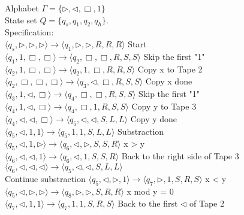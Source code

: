 \documentclass[12pt,a4paper]{article}
\theoremstyle{definition}
\numberwithin{equation}{section}
\numberwithin{figure}{section}
\begin{document}
\begin{enumerate}
Alphabet  $\Gamma = \{ \triangleright, \triangleleft, \Box, 1 \}$\\
State set $Q = \{ q_s, q_1, q_2, q_h \}$. \\
Specification:\\
$\langle q_s,\triangleright,\triangleright,\triangleright \rangle  \rightarrow  \langle q_1, \triangleright, \triangleright ,R , R, R \rangle$ Start\\
$\langle q_1, 1,\Box, \Box \rangle  \rightarrow  \langle q_2, \Box, \Box, R, S, S \rangle$ Skip the first "1"\\
$\langle q_2, 1,\Box, \Box \rangle  \rightarrow  \langle q_2, 1, \Box, R, R, S \rangle$ Copy x to Tape 2 \\
$\langle q_2, \Box, \Box, \Box \rangle  \rightarrow  \langle q_3, \triangleleft, \Box, R, S, S \rangle$ Copy x done \\
$\langle q_3, 1, \triangleleft, \Box \rangle  \rightarrow  \langle q_4, \Box, \Box, R, S, S \rangle$ Skip the first "1" \\
$\langle q_4, 1,\triangleleft, \Box \rangle  \rightarrow  \langle q_4, \Box, 1, R, S, S \rangle$ Copy y to Tape 3 \\
$\langle q_4, \triangleleft,\triangleleft, \Box \rangle  \rightarrow  \langle q_5, \triangleleft, \triangleleft, S, L, L \rangle$ Copy y done \\
$\langle q_5, \triangleleft, 1, 1 \rangle  \rightarrow  \langle q_5, 1, 1, S, L, L \rangle$ Substraction \\
$\langle q_5, \triangleleft, 1, \triangleright \rangle  \rightarrow  \langle q_6, \triangleleft, \triangleright, S, S, R \rangle$  x > y \\
$\langle q_6, \triangleleft, \triangleleft, 1 \rangle  \rightarrow  \langle q_6, \triangleleft, 1, S, S, R \rangle$ Back to the right side of Tape 3 \\
$\langle q_6, \triangleleft, \triangleleft, \triangleleft \rangle  \rightarrow  \langle q_5, \triangleleft, \triangleleft, S, L, L \rangle$ \\ Continue substraction
$\langle q_5, \triangleleft, \triangleright, 1 \rangle  \rightarrow  \langle q_7, \triangleright, 1, S, R, S \rangle$  x < y \\
$\langle q_5, \triangleleft, \triangleright, \triangleright \rangle  \rightarrow  \langle q_8, \triangleright, \triangleright, S, R, R \rangle$  x mod y = 0\\
$\langle q_7, \triangleleft, 1, 1 \rangle  \rightarrow  \langle q_7, 1, 1, S, R, S \rangle$  Back to the first $\triangleleft$ of Tape 2 \\

\end{enumerate}
\end{document}
